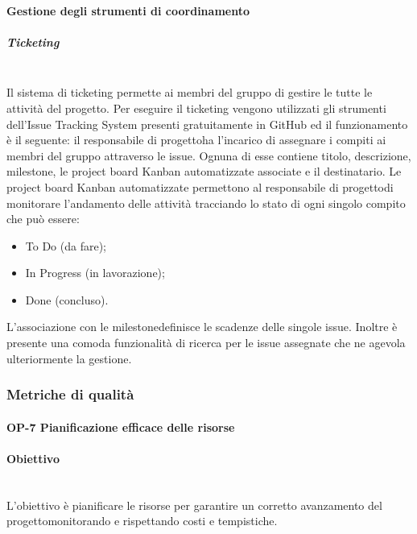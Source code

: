 		\paragraph{Gestione degli strumenti di coordinamento}
			\subparagraph{Ticketing}\mbox{}\\ [1mm]
				Il sistema di ticketing permette ai membri del gruppo di gestire le tutte le attività del progetto\glo.
				Per eseguire il ticketing vengono utilizzati gli strumenti dell'Issue Tracking System presenti gratuitamente in GitHub ed il funzionamento è il seguente:
				il responsabile di progetto\glosp ha l'incarico di assegnare i compiti ai membri del gruppo attraverso le issue. Ognuna di esse contiene titolo, descrizione, milestone, le project board Kanban automatizzate associate e il destinatario.
				Le project board Kanban automatizzate permettono al responsabile di progetto\glosp di monitorare l'andamento delle attività tracciando lo stato di ogni singolo compito che può essere:
				\begin{itemize}
					\item To Do (da fare);
					\item In Progress (in lavorazione);
					\item Done (concluso).
				\end{itemize}
				L'associazione con le milestone\glosp definisce le scadenze delle singole issue.
				Inoltre è presente una comoda funzionalità di ricerca per le issue assegnate che ne agevola ulteriormente la gestione.
				
		\subsubsection{Metriche di qualità}
			\paragraph{OP-7 Pianificazione efficace delle risorse}
			\paragraph*{Obiettivo}\mbox{}\\ [1mm]
			L'obiettivo è pianificare le risorse per garantire un corretto avanzamento del progetto\glosp monitorando e rispettando costi e tempistiche.
